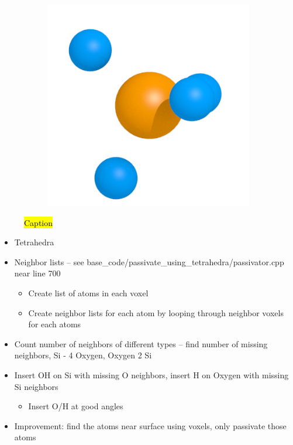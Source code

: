 \begin{figure}
\begin{subfigure}[b]{0.24\textwidth}
        \caption{}
    \end{subfigure}
    \begin{subfigure}[b]{0.24\textwidth}
        \includegraphics[width=\textwidth]{images/passivation/tetrahedra04.png}
        \caption{}
    \end{subfigure}
    \caption{\hl{Caption}}
    \label{fig:passivation}
\end{figure}

\begin{itemize}
    \item Tetrahedra
    \item Neighbor lists -- see base\_code/passivate\_using\_tetrahedra/passivator.cpp near line 700
    \begin{itemize}
        \item Create list of atoms in each voxel
        \item Create neighbor lists for each atom by looping through neighbor voxels for each atoms
    \end{itemize}
    \item Count number of neighbors of different types -- find number of missing neighbors, Si - 4 Oxygen, Oxygen 2 Si
    \item Insert OH on Si with missing O neighbors, insert H on Oxygen with missing Si neighbors
    \begin{itemize}
        \item Insert O/H at good angles
    \end{itemize}
    \item Improvement: find the atoms near surface using voxels, only passivate those atoms
\end{itemize}

